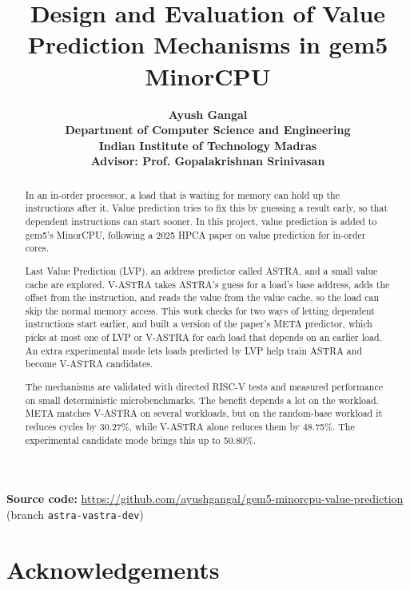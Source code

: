 \documentclass[11pt,a4paper]{article}
\title{
    \textbf{Design and Evaluation of Value Prediction
    Mechanisms in gem5 MinorCPU}
}
\author{
    \textbf{Ayush Gangal}\\
    \textbf{Department of Computer Science and Engineering}\\
    \textbf{Indian Institute of Technology Madras}\\
    \textbf{Advisor: Prof. Gopalakrishnan Srinivasan}
}
\date{}
\begin{document}
\maketitle

\begin{abstract}
In an in-order processor, a load that is waiting for memory can hold up the instructions after it. Value prediction tries to fix this by guessing a result early, so that dependent instructions can start sooner. In this project, value prediction is added to gem5's MinorCPU, following a 2025 HPCA paper on value prediction for in-order cores.

Last Value Prediction (LVP), an address predictor called ASTRA, and a small value cache are explored. V-ASTRA takes ASTRA's guess for a load's base address, adds the offset from the instruction, and reads the value from the value cache, so the load can skip the normal memory access. This work checks for two ways of letting dependent instructions start earlier, and built a version of the paper's META predictor, which picks at most one of LVP or V-ASTRA for each load that depends on an earlier load. An extra experimental mode lets loads predicted by LVP help train ASTRA and become V-ASTRA candidates.

The mechanisms are validated with directed RISC-V tests and measured performance on small deterministic microbenchmarks. The benefit depends a lot on the workload. META matches V-ASTRA on several workloads, but on the random-base workload it reduces cycles by 30.27\%, while V-ASTRA alone reduces them by 48.75\%. The experimental candidate mode brings this up to 50.80\%.
\end{abstract}

{\raggedright\noindent\textbf{Source code:} \url{https://github.com/ayushgangal/gem5-minorcpu-value-prediction}
(branch \texttt{astra-vastra-dev})\par}

\newpage

\tableofcontents
\newpage


\newpage

\newpage

\newpage

\newpage

\newpage

\newpage


\section*{Acknowledgements}
\end{document}
